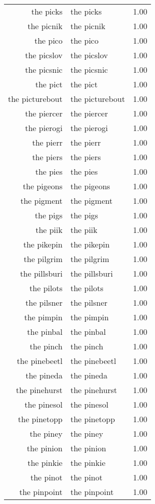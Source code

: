 \begin{table}[ht]
\begin{tabular}{rlr}
  the picks & the picks & 1.00 \\ 
  the picnik & the picnik & 1.00 \\ 
  the pico & the pico & 1.00 \\ 
  the picslov & the picslov & 1.00 \\ 
  the picsnic & the picsnic & 1.00 \\ 
  the pict & the pict & 1.00 \\ 
  the picturebout & the picturebout & 1.00 \\ 
  the piercer & the piercer & 1.00 \\ 
  the pierogi & the pierogi & 1.00 \\ 
  the pierr & the pierr & 1.00 \\ 
  the piers & the piers & 1.00 \\ 
  the pies & the pies & 1.00 \\ 
  the pigeons & the pigeons & 1.00 \\ 
  the pigment & the pigment & 1.00 \\ 
  the pigs & the pigs & 1.00 \\ 
  the piik & the piik & 1.00 \\ 
  the pikepin & the pikepin & 1.00 \\ 
  the pilgrim & the pilgrim & 1.00 \\ 
  the pillsburi & the pillsburi & 1.00 \\ 
  the pilots & the pilots & 1.00 \\ 
  the pilsner & the pilsner & 1.00 \\ 
  the pimpin & the pimpin & 1.00 \\ 
  the pinbal & the pinbal & 1.00 \\ 
  the pinch & the pinch & 1.00 \\ 
  the pinebeetl & the pinebeetl & 1.00 \\ 
  the pineda & the pineda & 1.00 \\ 
  the pinehurst & the pinehurst & 1.00 \\ 
  the pinesol & the pinesol & 1.00 \\ 
  the pinetopp & the pinetopp & 1.00 \\ 
  the piney & the piney & 1.00 \\ 
  the pinion & the pinion & 1.00 \\ 
  the pinkie & the pinkie & 1.00 \\ 
  the pinot & the pinot & 1.00 \\ 
  the pinpoint & the pinpoint & 1.00 \\ 

\end{tabular}
\end{table}
